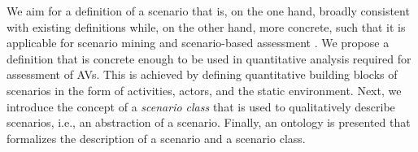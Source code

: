We aim for a definition of a scenario that is, on the one hand, broadly consistent with existing definitions \cite{geyer2014, ulbrich2015, elrofai2016scenario} while, on the other hand, more concrete, such that it is applicable for scenario mining \cite{elrofai2016scenario} and scenario-based assessment \cite{stellet2015taxonomy, deGelder2017assessment}. We propose a definition that is concrete enough to be used in quantitative analysis required for assessment of AVs. This is achieved by defining quantitative building blocks of scenarios in the form of activities, actors, and the static environment. Next, we introduce the concept of a \emph{scenario class} that is used to qualitatively describe scenarios, i.e., an abstraction of a scenario. Finally, an ontology is presented that formalizes the description of a scenario and a scenario class. 


